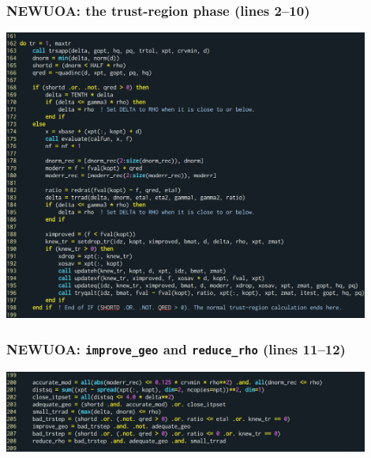 \documentclass[slidestop,mathserif,xcolor=dvipsnames]{beamer}
\begin{document}
\begin{frame}
    \frametitle{NEWUOA: the trust-region phase (lines 2--10)}
    \vspace{-2.2ex}
    \begin{center}
        \includegraphics[width=0.9\textwidth]{newuoa_tr.png}
    \end{center}
\end{frame}

\begin{frame}
    \frametitle{NEWUOA: \texttt{improve\_geo} and \texttt{reduce\_rho} (lines 11--12)}
    \vspace{12ex}
    \begin{center}
        \includegraphics[width=0.9\textwidth]{newuoa_geo_rho.png}
    \end{center}
\end{frame}
\end{document}
